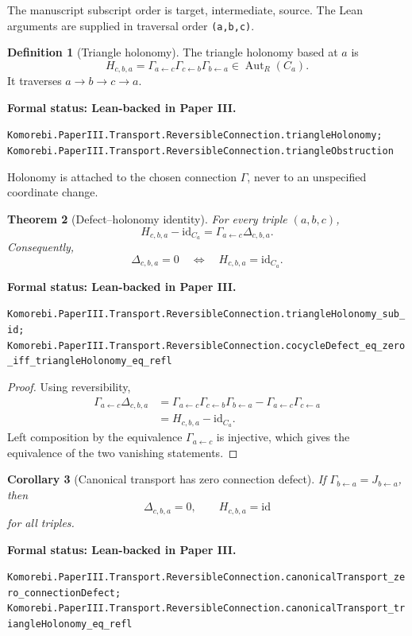 \documentclass[11pt]{article}
\newtheorem{theorem}{Theorem}[section]
\newtheorem{corollary}[theorem]{Corollary}
\theoremstyle{definition}
\newtheorem{definition}[theorem]{Definition}
\theoremstyle{remark}
\newcommand{\id}{\mathrm{id}}
\newcommand{\leanname}[1]{\nolinkurl{#1}}
\newcommand{\statusleanthree}[1]{%
  \par\smallskip\noindent
  {\color{leanblue}\textbf{Formal status: Lean-backed in Paper III.}}\par
  \begingroup\small\raggedright\leanname{#1}\par\endgroup\smallskip}
\begin{document}
The manuscript subscript order is target, intermediate, source.  The Lean
arguments are supplied in traversal order \leanname{(a,b,c)}.

\begin{definition}[Triangle holonomy]
\label{def:triangle-holonomy}
The triangle holonomy based at $a$ is
\[
H_{c,b,a}
=
\Gamma_{a\leftarrow c}
\Gamma_{c\leftarrow b}
\Gamma_{b\leftarrow a}
\in\operatorname{Aut}_R(C_a).
\]
It traverses $a\to b\to c\to a$.
\end{definition}
\statusleanthree{Komorebi.PaperIII.Transport.ReversibleConnection.triangleHolonomy; Komorebi.PaperIII.Transport.ReversibleConnection.triangleObstruction}

Holonomy is attached to the chosen connection $\Gamma$, never to an
unspecified coordinate change.

\begin{theorem}[Defect--holonomy identity]
\label{thm:defect-holonomy}
For every triple $(a,b,c)$,
\[
\boxed{
H_{c,b,a}-\id_{C_a}
=
\Gamma_{a\leftarrow c}\Delta_{c,b,a}.
}
\]
Consequently,
\[
\Delta_{c,b,a}=0
\quad\Longleftrightarrow\quad
H_{c,b,a}=\id_{C_a}.
\]
\end{theorem}
\statusleanthree{Komorebi.PaperIII.Transport.ReversibleConnection.triangleHolonomy_sub_id; Komorebi.PaperIII.Transport.ReversibleConnection.cocycleDefect_eq_zero_iff_triangleHolonomy_eq_refl}

\begin{proof}
Using reversibility,
\[
\begin{aligned}
\Gamma_{a\leftarrow c}\Delta_{c,b,a}
&=
\Gamma_{a\leftarrow c}
\Gamma_{c\leftarrow b}
\Gamma_{b\leftarrow a}
-
\Gamma_{a\leftarrow c}\Gamma_{c\leftarrow a}\\
&=H_{c,b,a}-\id_{C_a}.
\end{aligned}
\]
Left composition by the equivalence $\Gamma_{a\leftarrow c}$ is injective,
which gives the equivalence of the two vanishing statements.
\end{proof}

\begin{corollary}[Canonical transport has zero connection defect]
\label{cor:canonical-zero-defect}
If $\Gamma_{b\leftarrow a}=J_{b\leftarrow a}$, then
\[
\Delta_{c,b,a}=0,
\qquad
H_{c,b,a}=\id
\]
for all triples.
\end{corollary}
\statusleanthree{Komorebi.PaperIII.Transport.ReversibleConnection.canonicalTransport_zero_connectionDefect; Komorebi.PaperIII.Transport.ReversibleConnection.canonicalTransport_triangleHolonomy_eq_refl}
\end{document}
